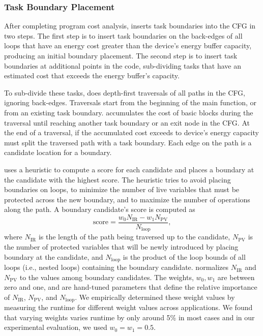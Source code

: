\subsubsection{Task Boundary Placement}
\label{sec:compiler_boundary}

After completing program cost analysis, \sys inserts task boundaries into the CFG in two steps. The first step is to insert task boundaries on the back-edges of all loops that have an energy cost greater than the device's energy buffer capacity, producing an initial boundary placement. The second step is to insert task boundaries at additional points in the code, sub-dividing tasks that have an estimated cost that exceeds the energy buffer's capacity.

To sub-divide these tasks, \sys does depth-first traversals of all paths in the CFG, ignoring back-edges. Traversals start from the beginning of the main function, or from an existing task boundary. \sys accumulates the cost of basic blocks during the traversal until reaching another task boundary or an exit node in the CFG. At the end of a traversal, if the accumulated cost exceeds to device's energy capacity \sys must split the traversed path with a task boundary. Each edge on the path is a candidate location for a boundary.

\sys uses a heuristic to compute a score for each candidate and places a boundary at the candidate with the highest score. The heuristic tries to avoid placing boundaries on loops, to minimize the number of live variables that must be protected across the new boundary, and to maximize the number of operations along the path. A boundary candidate's score is computed as
%
\begin{equation}
\text{score} = \frac{w_{0} N_{\text{IR}} - w_{1} N_{\text{PV}}}{N_{\text{loop}}},\nonumber
\end{equation}
%
where $N_{\text{IR}}$ is the length of the path being traversed up to the candidate, $N_{\text{PV}}$ is the number of protected variables that will be newly introduced by placing boundary at the candidate, and $N_{\text{loop}}$ is the product of the loop bounds of all loops (i.e., nested loops) containing the boundary candidate. \sys normalizes $N_{\text{IR}}$ and $N_{\text{PV}}$ to the values among boundary candidates. The weights, $w_{0}, w_{1}$ are between zero and one, and are hand-tuned parameters that define the relative importance of $N_{\text{IR}}$,
$N_{\text{PV}}$, and $N_{\text{loop}}$. We empirically determined these weight values by measuring the runtime for different weight values across applications. We found that varying weights varies runtime by only around 5\% in most cases and in our experimental evaluation, we used $w_{0} = w_{1} = 0.5$.

